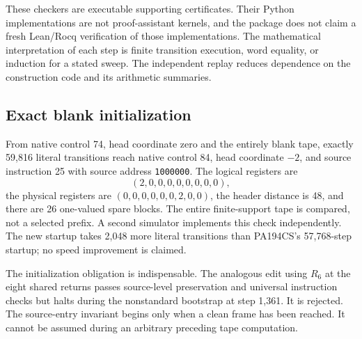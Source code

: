 \documentclass[11pt,letterpaper]{article}
\begin{document}
These checkers are executable supporting certificates. Their Python
implementations are not proof-assistant kernels, and the package does
not claim a fresh Lean/Rocq verification of those implementations. The
mathematical interpretation of each step is finite transition execution,
word equality, or induction for a stated sweep. The independent replay
reduces dependence on the construction code and its arithmetic summaries.

\subsection{Exact blank initialization}
From native control 74, head coordinate zero and the entirely blank tape,
exactly 59,816 literal transitions reach native control 84, head coordinate
$-2$, and source instruction 25 with source address \texttt{1000000}.
The logical registers are
\[
 (2,0,0,0,0,0,0,0,0),
\]
the physical registers are $(0,0,0,0,0,0,2,0,0)$, the header distance is
48, and there are 26 one-valued spare blocks. The entire finite-support
tape is compared, not a selected prefix. A second simulator implements
this check independently. The new startup takes 2,048 more literal
transitions than PA194CS's 57,768-step startup; no speed improvement is
claimed.

The initialization obligation is indispensable. The analogous edit using
$R_6$ at the eight shared returns passes source-level preservation and
universal instruction checks but halts during the nonstandard bootstrap
at step 1,361. It is rejected. The source-entry invariant begins only
when a clean frame has been reached. It cannot be assumed during an
arbitrary preceding tape computation.
\end{document}
